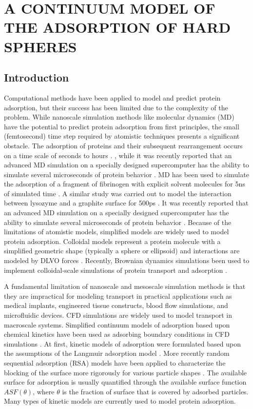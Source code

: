 
\chapter{A CONTINUUM MODEL OF THE ADSORPTION OF HARD SPHERES}


\section{Introduction}

Computational methods have been applied to model and predict protein
adsorption, but their success has been limited due to the complexity
of the problem. While nanoscale simulation methods like molecular
dynamics (MD) have the potential to predict protein adsorption from
first principles, the small (femtosecond) time step required by atomistic
techniques presents a significant obstacle. The adsorption of proteins
and their subsequent rearrangement occurs on a time scale of seconds
to hours \cite{Latour2005}. , while it was recently reported that
an advanced MD simulation on a specially designed supercomputer has
the ability to simulate several microseconds of protein behavior \cite{Dror2010}.
MD has been used to simulate the adsorption of a fragment of fibrinogen
with explicit solvent molecules for 5ns of simulated time \cite{Agashe2005}.
A similar study was carried out to model the interaction between lysozyme
and a graphite surface for 500ps \cite{Raffaini2010}. It was recently
reported that an advanced MD simulation on a specially designed supercomputer
has the ability to simulate several microseconds of protein behavior
\cite{Dror2010}. Because of the limitations of atomistic models,
simplified models are widely used to model protein adsorption. Colloidal
models represent a protein molecule with a simplified geometric shape
(typically a sphere or ellipsoid) and interactions are modeled by
DLVO forces \cite{evans1994colloidal}. Recently, Brownian dynamics
simulations been used to implement colloidal-scale simulations of
protein transport and adsorption \cite{Unni2005,Magan2006,Quinn2008}. 

A fundamental limitation of nanoscale and mesoscale simulation methods
is that they are impractical for modeling transport in practical applications
such as medical implants, engineered tissue constructs, blood flow
simulations, and microfluidic devices. CFD simulations are widely
used to model transport in macroscale systems. Simplified continuum
models of adsorption based upon chemical kinetics have been used as
adsorbing boundary conditions in CFD simulations \cite{Jenkins2004}.
At first, kinetic models of adsorption were formulated based upon
the assumptions of the Langmuir adsorption model \cite{Andrade1986}.
More recently random sequential adsorption (RSA) models have been
applied to characterize the blocking of the surface more rigorously
for various particle shapes \cite{Talbot2000287}. The available surface
for adsorption is usually quantified through the available surface
function $ASF\left(\theta\right)$, where $\theta$ is the fraction
of surface that is covered by adsorbed particles. Many types of kinetic
models are currently used to model protein adsorption\cite{Rabe2010}. 

